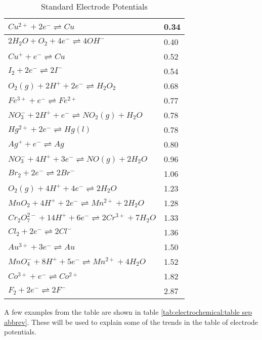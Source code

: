 \begin{table}
\begin{center}
\begin{tabular}{|l|l|}
$Cu^{2+} + 2e^{-} \rightleftharpoons Cu $& 0.34 \\ \hline
$2H_{2}O + O_{2} + 4e^{-} \rightleftharpoons 4OH^{-} $& 0.40 \\ \hline
$Cu^{+} + e^{-} \rightleftharpoons Cu $& 0.52 \\ \hline
$I_{2} + 2e^{-} \rightleftharpoons 2I^{-} $& 0.54 \\ \hline
$O_{2} (g) + 2H^{+} + 2e^{-} \rightleftharpoons H_{2}O_{2} $& 0.68 \\ \hline
$Fe^{3+} + e^{-} \rightleftharpoons Fe^{2+}  $& 0.77 \\ \hline
$NO_{3}^{-} + 2H^{+} + e^{-} \rightleftharpoons NO_{2} (g) + H_{2}O $& 0.78 \\ \hline
$Hg^{2+} + 2e^{-} \rightleftharpoons Hg (l) $& 0.78 \\ \hline
$Ag^{+} + e^{-} \rightleftharpoons Ag $& 0.80 \\ \hline
$NO_{3}^{-} + 4H^{+} +3 e^{-} \rightleftharpoons NO (g) + 2H_{2}O $& 0.96 \\ \hline
$Br_{2} + 2e^{-} \rightleftharpoons 2Br^{-} $& 1.06 \\ \hline
$O_{2} (g) + 4H^{+} + 4e^{-} \rightleftharpoons 2H_{2}O $& 1.23 \\ \hline
$MnO_{2} + 4H^{+} + 2e^{-} \rightleftharpoons Mn^{2+} + 2H_{2}O $& 1.28 \\ \hline
$Cr_{2}O_{7}^{2-} + 14H^{+} + 6e^{-} \rightleftharpoons 2Cr^{3+} + 7H_{2}O $& 1.33 \\ \hline
$Cl_{2} + 2e^{-} \rightleftharpoons 2Cl^{-} $& 1.36 \\ \hline
$Au^{3+} + 3e^{-} \rightleftharpoons Au $& 1.50 \\ \hline
$MnO_{4}^{-} + 8H^{+} + 5e^{-} \rightleftharpoons Mn^{2+} + 4H_{2}O $& 1.52 \\ \hline
$Co^{3+} + e^{-} \rightleftharpoons Co^{2+} $& 1.82 \\ \hline
$F_{2} + 2e^{-} \rightleftharpoons 2F^{-} $& 2.87 \\ \hline
\end{tabular}
\end{center}
\caption{Standard Electrode Potentials} 
\label{tab:electrochemical:table sep}
\end{table}

A few examples from the table are shown in table \ref{tab:electrochemical:table sep abbrev}. These will be used to explain some of the trends in the table of electrode potentials.

